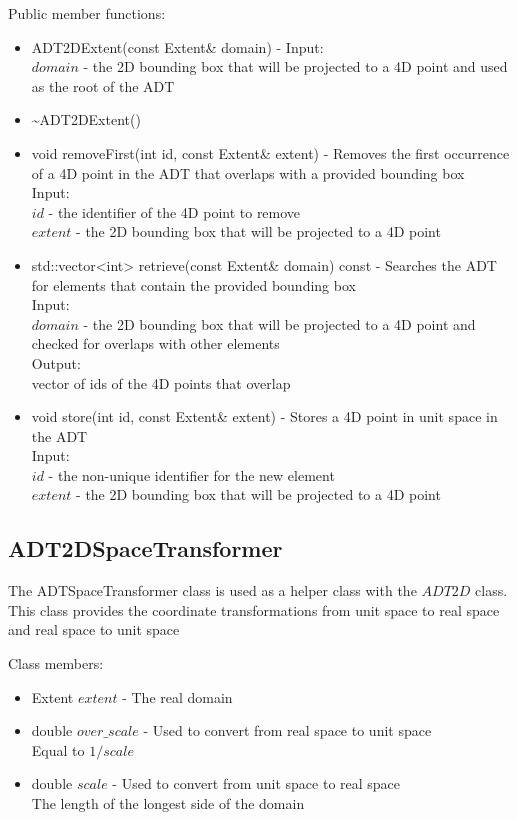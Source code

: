 \documentclass[manuscript, screen]{acmart}
\begin{document}
Public member functions:
\begin{itemize}
\item ADT2DExtent(const Extent\& domain) - Input:\\
$domain$ - the 2D bounding box that will be projected to a 4D point and used as the root of the ADT

\item \textasciitilde{}ADT2DExtent()
%

\item void removeFirst(int id, const Extent\& extent) - Removes the first occurrence of a 4D point in the ADT that overlaps with a provided bounding box\\
Input:\\
$id$ - the identifier of the 4D point to remove\\
$extent$ - the 2D bounding box that will be projected to a 4D point

\item std::vector<int> retrieve(const Extent\& domain) const - Searches the ADT for elements that contain the provided bounding box\\
Input:\\
$domain$ - the 2D bounding box that will be projected to a 4D point and checked for overlaps with other elements\\
Output:\\
vector of ids of the 4D points that overlap

\item void store(int id, const Extent\& extent) - Stores a 4D point in unit space in the ADT\\
Input:\\
$id$ - the non-unique identifier for the new element\\
$extent$ - the 2D bounding box that will be projected to a 4D point

\end{itemize}

\subsection{ADT2DSpaceTransformer}
The ADTSpaceTransformer class is used as a helper class with the $ADT2D$ class. This class provides the coordinate transformations from unit space to real space and real space to unit space

Class members:
\begin{itemize}
\item Extent $extent$ - The real domain

\item double $over\_scale$ - Used to convert from real space to unit space\\
Equal to $1/scale$

\item double $scale$ - Used to convert from unit space to real space\\
The length of the longest side of the domain
\end{itemize}
\end{document}
